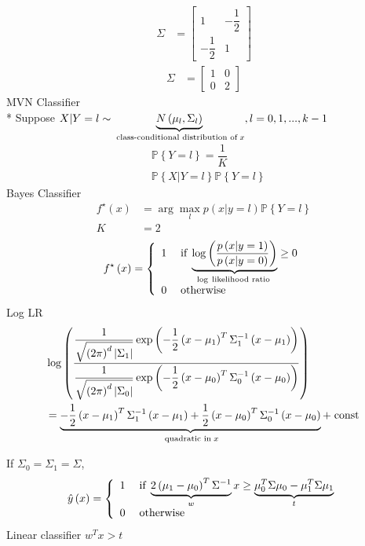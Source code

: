 \documentclass{article}
\begin{document}
\begin{align*}
\Sigma &= \begin{bmatrix} 1 & - \dfrac{1}{2} \\ - \dfrac{1}{2} & 1 \end{bmatrix}
\end{align*}
\begin{align*}
\Sigma &= \begin{bmatrix} 1 & 0 \\ 0 & 2 \end{bmatrix}
\end{align*}
MVN Classifier
\\* Suppose $X  | Y = l \sim  \underbrace{N\left(\mu_{l}, \Sigma_{l}\right)}_{\text{\;class-conditional distribution of\;} x }, l = 0, 1, ..., k - 1$
\begin{align*}
&  \mathbb{P}\left\{Y = l\right\} = \dfrac{1}{K}
\\ &  \mathbb{P}\left\{X | Y = l\right\} \mathbb{P}\left\{Y = l\right\}
\end{align*}
Bayes Classifier
\begin{align*}
f^\star \left(x\right) &= \arg\displaystyle\max_{l} p\left(x | y = l\right) \mathbb{P}\left\{Y = l \right\}
\\ K  &= 2
\end{align*}
\[ f^\star \left(x\right) =\left\{ \begin{array}{ll}
1& \text{\;if\;} \underbrace{\log\left(\dfrac{p\left(x | y = 1\right)}{p\left(x | y = 0\right)}\right)}_{\log \text{\;likelihood ratio\;}} \geq  0 \\
0& \text{\;otherwise\;} \\
\end{array}\right. \]
Log LR
\begin{align*}
&  \log\left(\dfrac{\dfrac{1}{\sqrt{\left(2 \pi\right)^{d} | \Sigma_{1} |}} \exp\left(- \dfrac{1}{2} \left(x - \mu_{1}\right)^{T} \Sigma_{1}^{-1} \left(x - \mu_{1}\right)\right)}{\dfrac{1}{\sqrt{\left(2 \pi\right)^{d} | \Sigma_{0} |}} \exp\left(- \dfrac{1}{2} \left(x - \mu_{0}\right)^{T} \Sigma_{0}^{-1} \left(x - \mu_{0}\right)\right)}\right)
\\ &= \underbrace{- \dfrac{1}{2} \left(x - \mu_{1}\right)^{T} \Sigma_{1}^{-1} \left(x - \mu_{1}\right) + \dfrac{1}{2} \left(x - \mu_{0}\right)^{T} \Sigma_{0}^{-1} \left(x - \mu_{0}\right)}_{\text{\;quadratic in\;} x } + \text{\;const\;}
\end{align*}

If $\Sigma_{0} = \Sigma_{1} = \Sigma$,
\[ \hat{y}\left(x\right) =\left\{ \begin{array}{ll}
1& \text{\;if\;} \underbrace{2\left(\mu_{1} - \mu_{0}\right)^{T} \Sigma^{-1}}_{w} x \geq  \underbrace{\mu_{0}^{T} \Sigma \mu_{0} - \mu_{1}^{T} \Sigma \mu_{1}}_{t } \\
0& \text{\;otherwise\;} \\
\end{array}\right. \]
Linear classifier $w^{T} x > t $
\end{document}
